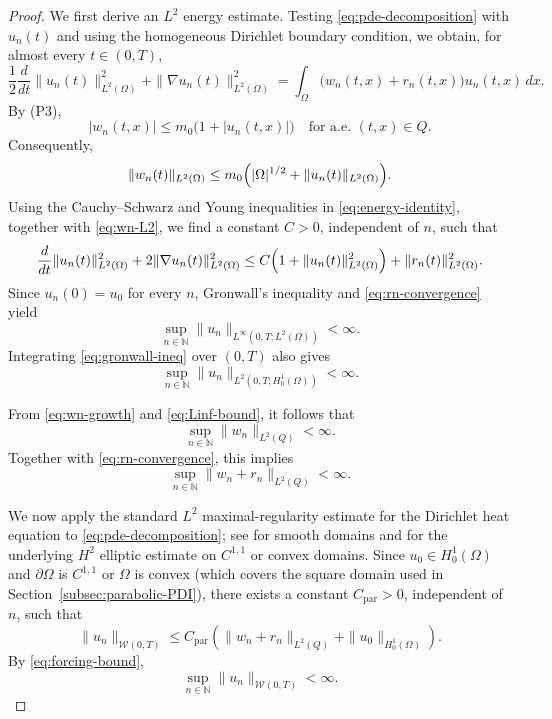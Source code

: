 \documentclass[11pt]{elsarticle}
\theoremstyle{definition}
\theoremstyle{remark}
\numberwithin{equation}{section}
\begin{document}
\begin{proof}
		We first derive an $L^2$ energy estimate. Testing
		\eqref{eq:pde-decomposition} with $u_n(t)$ and using the homogeneous Dirichlet
		boundary condition, we obtain, for almost every $t\in(0,T)$,
		\begin{equation}
		\frac{1}{2}\frac{d}{dt}
		\|u_n(t)\|_{L^2(\Omega)}^2
		+
		\|\nabla u_n(t)\|_{L^2(\Omega)}^2
		=
		\int_\Omega
		\bigl(w_n(t,x)+r_n(t,x)\bigr)u_n(t,x)\,dx.
		\label{eq:energy-identity}
		\end{equation}
		By \textup{(P3)},
		\begin{equation}
		|w_n(t,x)|
		\leq m_0\bigl(1+|u_n(t,x)|\bigr)
		\quad\text{for a.e. }(t,x)\in Q.
		\label{eq:wn-growth}
		\end{equation}
		Consequently,
		\begin{equation}
		\|w_n(t)\|_{L^2(\Omega)}
		\leq
		m_0\Bigl(
		|\Omega|^{1/2}
		+
		\|u_n(t)\|_{L^2(\Omega)}
		\Bigr).
		\label{eq:wn-L2}
		\end{equation}
		Using the Cauchy--Schwarz and Young inequalities in
		\eqref{eq:energy-identity}, together with \eqref{eq:wn-L2}, we find a constant
		$C>0$, independent of $n$, such that
		\begin{equation}
		\frac{d}{dt}
		\|u_n(t)\|_{L^2(\Omega)}^2
		+
		2\|\nabla u_n(t)\|_{L^2(\Omega)}^2
		\leq
		C\Bigl(
		1+\|u_n(t)\|_{L^2(\Omega)}^2
		\Bigr)
		+
		\|r_n(t)\|_{L^2(\Omega)}^2.
		\label{eq:gronwall-ineq}
		\end{equation}
		Since $u_n(0)=u_0$ for every $n$, Gronwall's inequality and
		\eqref{eq:rn-convergence} yield
		\begin{equation}
		\sup_{n\in\mathbb{N}}
		\|u_n\|_{L^\infty(0,T;L^2(\Omega))}
		<\infty.
		\label{eq:Linf-bound}
		\end{equation}
		Integrating \eqref{eq:gronwall-ineq} over $(0,T)$ also gives
		\[
		\sup_{n\in\mathbb{N}}
		\|u_n\|_{L^2(0,T;H_0^1(\Omega))}
		<\infty.
		\]
		
		From \eqref{eq:wn-growth} and \eqref{eq:Linf-bound}, it follows that
		\[
		\sup_{n\in\mathbb{N}}
		\|w_n\|_{L^2(Q)}
		<\infty.		
		\]
		Together with \eqref{eq:rn-convergence}, this implies
		\begin{equation}
		\sup_{n\in\mathbb{N}}
		\|w_n+r_n\|_{L^2(Q)}
		<\infty.
		\label{eq:forcing-bound}
		\end{equation}
		
		We now apply the standard $L^2$ maximal-regularity estimate for the
		Dirichlet heat equation to \eqref{eq:pde-decomposition}; see
		\cite[Section~7.1.3, Theorem~5]{Evans} for smooth domains and
		\cite[Theorem~3.2.1.2]{Grisvard1985} for the underlying $H^2$ elliptic
		estimate on $C^{1,1}$ or convex domains. Since
		$u_0\in H_0^1(\Omega)$ and $\partial\Omega$ is $C^{1,1}$ or $\Omega$ is convex (which covers the square domain used in Section~\ref{subsec:parabolic-PDI}), there exists a constant
		$C_{\mathrm{par}}>0$, independent of $n$, such that
		\[
		\|u_n\|_{\mathcal{W}(0,T)}
		\leq
		C_{\mathrm{par}}
		\left(
		\|w_n+r_n\|_{L^2(Q)}
		+
		\|u_0\|_{H_0^1(\Omega)}
		\right).
		\]
		By \eqref{eq:forcing-bound},
		\[
		\sup_{n\in\mathbb{N}}
		\|u_n\|_{\mathcal{W}(0,T)}
		<\infty.
		\]
		

\end{proof}
\end{document}
